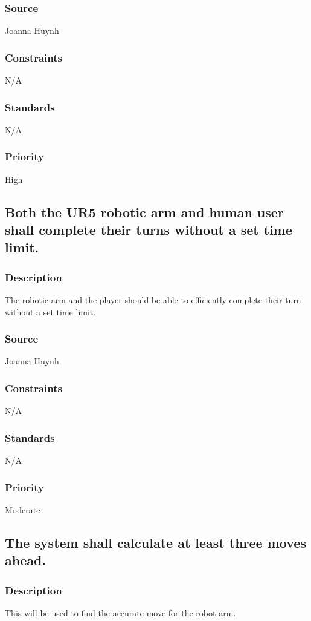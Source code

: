\subsubsection{Source}
Joanna Huynh
\subsubsection{Constraints}
N/A
\subsubsection{Standards}
N/A
\subsubsection{Priority}
High

\subsection{Both the UR5 robotic arm and human user shall complete their turns without a set time limit.}
\subsubsection{Description}
The robotic arm and the player should be able to efficiently complete their turn without a set time limit.
\subsubsection{Source}
Joanna Huynh
\subsubsection{Constraints}
N/A
\subsubsection{Standards}
N/A
\subsubsection{Priority}
Moderate

\subsection{The system shall calculate at least three moves ahead.}
\subsubsection{Description}
This will be used to find the accurate move for the robot arm.
